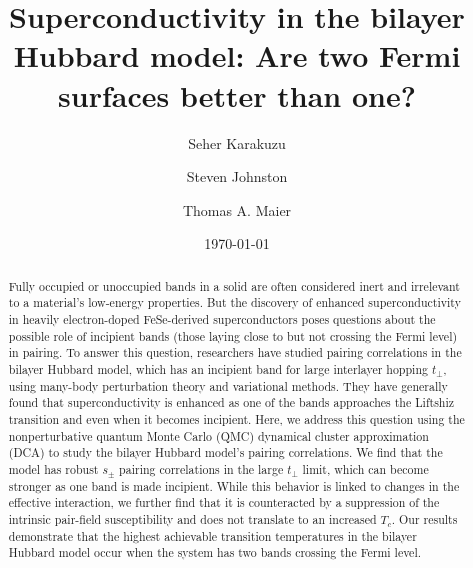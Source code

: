 \documentclass[prb,twocolumn,amsmath,amssymb,superscriptaddress,floatfix,nofootinbib]{revtex4-2}
\begin{document}
\title{Superconductivity in the bilayer Hubbard model: Are two Fermi surfaces better than one?}
\date{\today}



\author{Seher Karakuzu}

\author{Steven Johnston}

\author{Thomas A. Maier}

\begin{abstract}
Fully occupied or unoccupied bands in a solid are often considered inert and irrelevant to a material's low-energy properties. But the discovery of enhanced superconductivity in heavily electron-doped FeSe-derived superconductors poses questions about the possible role of incipient bands (those laying close to but not crossing the Fermi level) in pairing. To answer this question, researchers have studied pairing correlations in the bilayer Hubbard model, which has an incipient band for large interlayer hopping $t_\perp$, using many-body perturbation theory and variational methods. They have generally found that superconductivity is enhanced as one of the bands approaches the Liftshiz transition and even when it becomes incipient. Here, we address this question using the nonperturbative quantum Monte Carlo (QMC) dynamical cluster approximation (DCA) to study the bilayer Hubbard model's pairing correlations. We find that the model has robust $s_\pm$ pairing correlations in the large $t_\perp$ limit, which can become stronger as one band is made incipient. While this behavior is linked to changes in the effective interaction, we further find that it is  counteracted by a suppression of the intrinsic pair-field susceptibility and does not translate to an increased $T_c$. Our results demonstrate that the highest achievable transition temperatures in the bilayer Hubbard model occur when the system has two bands crossing the Fermi level.  
\end{abstract}
\maketitle
\end{document}
